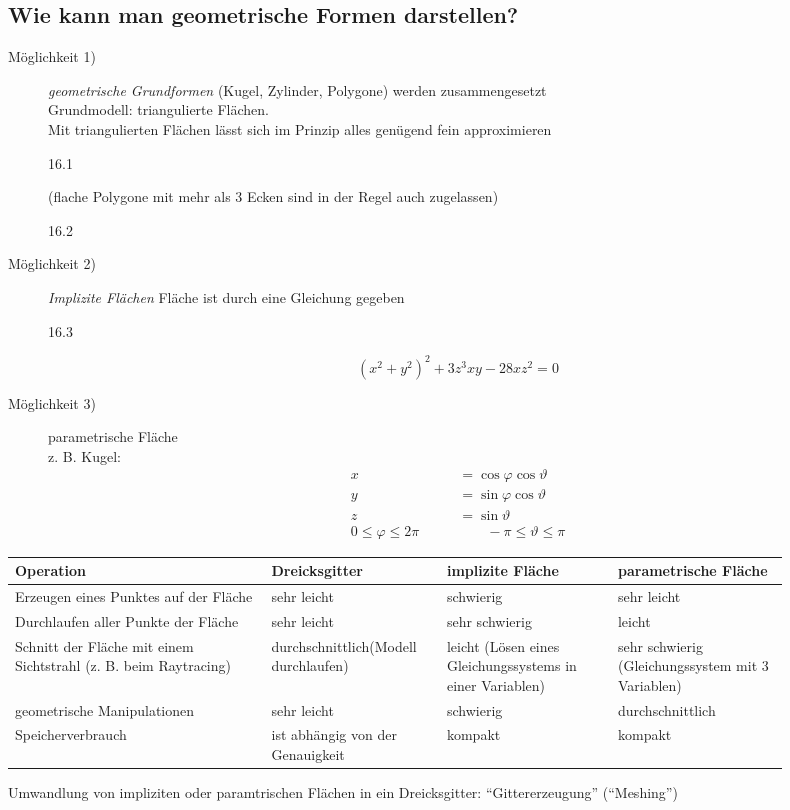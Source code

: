 \subsection{Wie kann man geometrische Formen darstellen?}
\begin{description}
 \item[Möglichkeit 1)] \emph{geometrische Grundformen} (Kugel, Zylinder, Polygone) werden zusammengesetzt\\[1em]
	Grundmodell: triangulierte Flächen.\\[1em]
	Mit triangulierten Flächen lässt sich im Prinzip alles genügend fein approximieren
	\begin{center}
	 16.1
	\end{center}
	(flache Polygone mit mehr als 3 Ecken sind in der Regel auch zugelassen)
	\begin{center}
	 16.2
	\end{center}
 \item[Möglichkeit 2)] \emph{Implizite Flächen} Fläche ist durch eine Gleichung gegeben
	\begin{center}
	 16.3
	\end{center}
	\[(x^2 + y^2)^2 + 3z^3xy - 28xz^2 = 0\]
 \item[Möglichkeit 3)] parametrische Fläche\\
	z. B. Kugel:
	\begin{align*}
	 x &= \cos \varphi \cos \vartheta\\
	 y &= \sin \varphi \cos \vartheta\\
	 z &= \sin \vartheta\\
	 0 \le \varphi \le 2 \pi \qquad & \qquad -\pi \le \vartheta \le \pi
	\end{align*}
\end{description}
\begin{center}
 \begin{tabular}{p{0.3\linewidth}|p{0.2\linewidth}|p{0.2\linewidth}|p{0.2\linewidth}}
  \textbf{Operation} & \textbf{Dreicksgitter} & \textbf{implizite Fläche} & \textbf{parametrische Fläche}\\
  \hline\hline
  Erzeugen eines Punktes auf der Fläche &
	sehr leicht & schwierig & sehr leicht \\\hline
  Durchlaufen aller Punkte der Fläche &
	sehr leicht & sehr schwierig & leicht \\\hline
  Schnitt der Fläche mit einem Sichtstrahl\newline
  (z. B. beim Raytracing)
	 & durchschnittlich\footnotemark[1] (Modell durchlaufen)
	 & leicht (Lösen eines Gleichungssystems in einer Variablen)
	 & sehr schwierig (Gleichungssystem mit 3 Variablen)\\\hline
  geometrische Manipulationen &
	sehr leicht & schwierig & durchschnittlich\\\hline
  Speicherverbrauch & ist abhängig von der Genauigkeit & kompakt & kompakt
 \end{tabular}
\end{center}
Umwandlung von impliziten oder paramtrischen Flächen in ein Dreicksgitter: "`Gittererzeugung"' ("`Meshing"')

